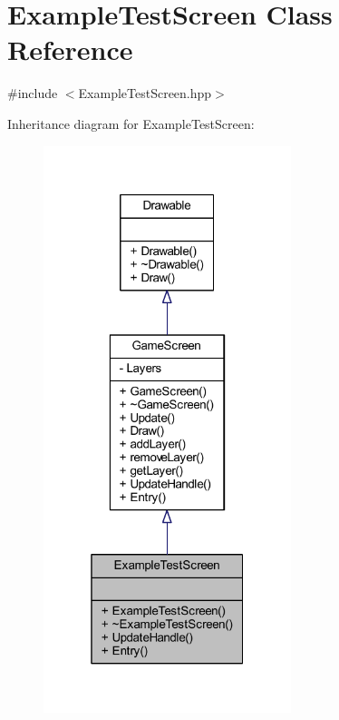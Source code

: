 \hypertarget{class_example_test_screen}{\section{Example\-Test\-Screen Class Reference}
\label{class_example_test_screen}
}


{\ttfamily \#include $<$Example\-Test\-Screen.\-hpp$>$}



Inheritance diagram for Example\-Test\-Screen\-:\nopagebreak
\begin{figure}[H]
\begin{center}
\leavevmode
\includegraphics[width=205pt]{class_example_test_screen__inherit__graph}
\end{center}
\end{figure}


